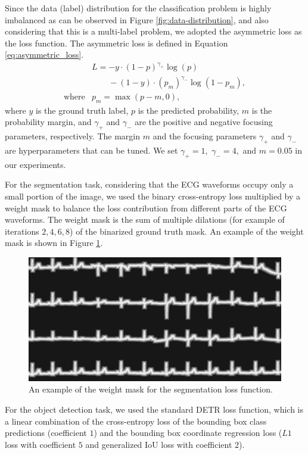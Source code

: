 Since the data (label) distribution for the classification problem is highly imbalanced as can be observed in Figure \ref{fig:data-distribution}, and also considering that this is a multi-label problem, we adopted the asymmetric loss \cite{ridnik2021asymmetric_loss} as the loss function. The asymmetric loss is defined in Equation \eqref{eq:asymmetric_loss}.
\begin{equation}
\label{eq:asymmetric_loss}
\begin{array}{ll}
& L = -y \cdot (1-p)^{\gamma_{+}} \log(p) \\
& \phantom{L = } - (1-y) \cdot (p_m)^{\gamma_{-}} \log(1-p_m), \\
\text{where} & p_m = \max(p - m, 0),
\end{array}
\end{equation}
where $y$ is the ground truth label, $p$ is the predicted probability, $m$ is the probability margin, and $\gamma_{+}$ and $\gamma_{-}$ are the positive and negative focusing parameters, respectively. The margin $m$ and the focusing parameters $\gamma_{+}$ and $\gamma_{-}$ are hyperparameters that can be tuned. We set $\gamma_{+} = 1,$ $\gamma_{-} = 4,$ and $m = 0.05$ in our experiments.

For the segmentation task, considering that the ECG waveforms occupy only a small portion of the image, we used the binary cross-entropy loss multiplied by a weight mask to balance the loss contribution from different parts of the ECG waveforms. The weight mask is the sum of multiple dilations (for example of iterations $2, 4, 6, 8$) of the binarized ground truth mask. An example of the weight mask is shown in Figure \ref{fig:weight-mask}.

\begin{figure}[!htp]
\centering
\includegraphics[width=\linewidth]{images/weight-mask.pdf}
\caption{An example of the weight mask for the segmentation loss function.}
\label{fig:weight-mask}
\end{figure}

For the object detection task, we used the standard DETR loss function, which is a linear combination of the cross-entropy loss of the bounding box class predictions (coefficient $1$) and the bounding box coordinate regression loss ($L1$ loss with coefficient $5$ and generalized IoU loss with coefficient $2$).
